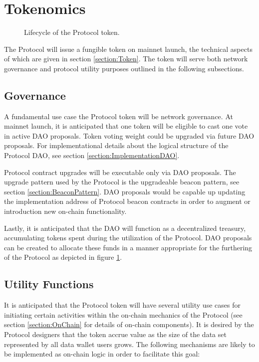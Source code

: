 \section{Tokenomics}
\label{section:tokenomics}

\begin{figure}[!ht] 
    \centering
    \caption{Lifecycle of the Protocol token.}
    \label{fig:Tokenomics}
\end{figure}

The Protocol will issue a fungible token on mainnet launch, the technical aspects of which are given in section \ref{section:Token}. The token will serve both network governance and protocol utility purposes outlined in the following subsections. 

\subsection{Governance}
\label{section:Governance}
A fundamental use case the Protocol token will be network governance. At mainnet launch, it is anticipated that one token will be eligible to cast one vote in active DAO proposals. Token voting weight could be upgraded via future DAO proposals. For implementational details about the logical structure of the Protocol DAO, see section \ref{section:ImplementationDAO}.

Protocol contract upgrades will be executable only via DAO proposals. The upgrade pattern used by the Protocol is the upgradeable beacon pattern, see section \ref{section:BeaconPattern}. DAO proposals would be capable up updating the implementation address of Protocol beacon contracts in order to augment or introduction new on-chain functionality.

Lastly, it is anticipated that the DAO will function as a decentralized treasury, accumulating tokens spent during the utilization of the Protocol. DAO proposals can be 
created to allocate these funds in a manner appropriate for the furthering of the Protocol as depicted in figure \ref{fig:Tokenomics}.

\subsection{Utility Functions}
\label{section:TokenUtility}

It is anticipated that the Protocol token will have several utility use cases for initiating certain activities within the on-chain mechanics of the Protocol (see section \ref{section:OnChain} for details of on-chain components). It is desired by the Protocol designers that the token accrue value as the size of the data set represented by all data wallet users grows. The following mechanisms are likely to be implemented as on-chain logic in order to facilitate this goal:

